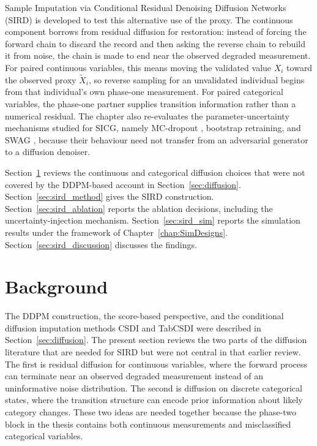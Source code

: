 Sample Imputation via Conditional Residual Denoising Diffusion Networks (SIRD) is developed to test this alternative use of the proxy. The continuous component borrows from residual diffusion for restoration: instead of forcing the forward chain to discard the record and then asking the reverse chain to rebuild it from noise, the chain is made to end near the observed degraded measurement. For paired continuous variables, this means moving the validated value \(X_i\) toward the observed proxy \(\tilde{X}_i\), so reverse sampling for an unvalidated individual begins from that individual's own phase-one measurement. For paired categorical variables, the phase-one partner supplies transition information rather than a numerical residual. The chapter also re-evaluates the parameter-uncertainty mechanisms studied for SICG, namely MC-dropout \citep{gal2016dropout}, bootstrap retraining, and SWAG \citep{maddox2019simple}, because their behaviour need not transfer from an adversarial generator to a diffusion denoiser.

Section~\ref{sec:sird_background} reviews the continuous and categorical diffusion choices that were not covered by the DDPM-based account in Section~\ref{sec:diffusion}. Section~\ref{sec:sird_method} gives the SIRD construction. Section~\ref{sec:sird_ablation} reports the ablation decisions, including the uncertainty-injection mechanism. Section~\ref{sec:sird_sim} reports the simulation results under the framework of Chapter~\ref{chap:SimDesigns}. Section~\ref{sec:sird_discussion} discusses the findings.


\section{Background}
\label{sec:sird_background}

The DDPM construction, the score-based perspective, and the conditional diffusion imputation methods CSDI and TabCSDI were described in Section~\ref{sec:diffusion}. The present section reviews the two parts of the diffusion literature that are needed for SIRD but were not central in that earlier review. The first is residual diffusion for continuous variables, where the forward process can terminate near an observed degraded measurement instead of an uninformative noise distribution. The second is diffusion on discrete categorical states, where the transition structure can encode prior information about likely category changes. These two ideas are needed together because the phase-two block in the thesis contains both continuous measurements and misclassified categorical variables.



